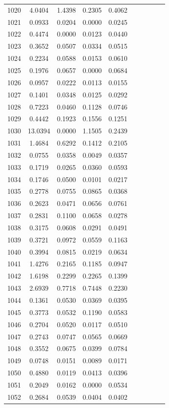 \begin{table}
\begin{tabular}{cccccccccc}
1020& 4.0404& 1.4398& 0.2305& 0.4062\\ 
1021& 0.0933& 0.0204& 0.0000& 0.0245\\ 
1022& 0.4474& 0.0000& 0.0123& 0.0440\\ 
1023& 0.3652& 0.0507& 0.0334& 0.0515\\ 
1024& 0.2234& 0.0588& 0.0153& 0.0610\\ 
1025& 0.1976& 0.0657& 0.0000& 0.0684\\ 
1026& 0.0957& 0.0222& 0.0113& 0.0155\\ 
1027& 0.1401& 0.0348& 0.0125& 0.0292\\ 
1028& 0.7223& 0.0460& 0.1128& 0.0746\\ 
1029& 0.4442& 0.1923& 0.1556& 0.1251\\ 
1030& 13.0394& 0.0000& 1.1505& 0.2439\\ 
1031& 1.4684& 0.6292& 0.1412& 0.2105\\ 
1032& 0.0755& 0.0358& 0.0049& 0.0357\\ 
1033& 0.1719& 0.0265& 0.0360& 0.0593\\ 
1034& 0.1746& 0.0500& 0.0101& 0.0217\\ 
1035& 0.2778& 0.0755& 0.0865& 0.0368\\ 
1036& 0.2623& 0.0471& 0.0656& 0.0761\\ 
1037& 0.2831& 0.1100& 0.0658& 0.0278\\ 
1038& 0.3175& 0.0608& 0.0291& 0.0491\\ 
1039& 0.3721& 0.0972& 0.0559& 0.1163\\ 
1040& 0.3994& 0.0815& 0.0219& 0.0634\\ 
1041& 1.4276& 0.2165& 0.1185& 0.0947\\ 
1042& 1.6198& 0.2299& 0.2265& 0.1399\\ 
1043& 2.6939& 0.7718& 0.7448& 0.2230\\ 
1044& 0.1361& 0.0530& 0.0369& 0.0395\\ 
1045& 0.3773& 0.0532& 0.1190& 0.0583\\ 
1046& 0.2704& 0.0520& 0.0117& 0.0510\\ 
1047& 0.2743& 0.0747& 0.0565& 0.0669\\ 
1048& 0.3552& 0.0675& 0.0399& 0.0784\\ 
1049& 0.0748& 0.0151& 0.0089& 0.0171\\ 
1050& 0.4880& 0.0119& 0.0413& 0.0396\\ 
1051& 0.2049& 0.0162& 0.0000& 0.0534\\ 
1052& 0.2684& 0.0539& 0.0404& 0.0402\\ 

\end{tabular}
\end{table}
